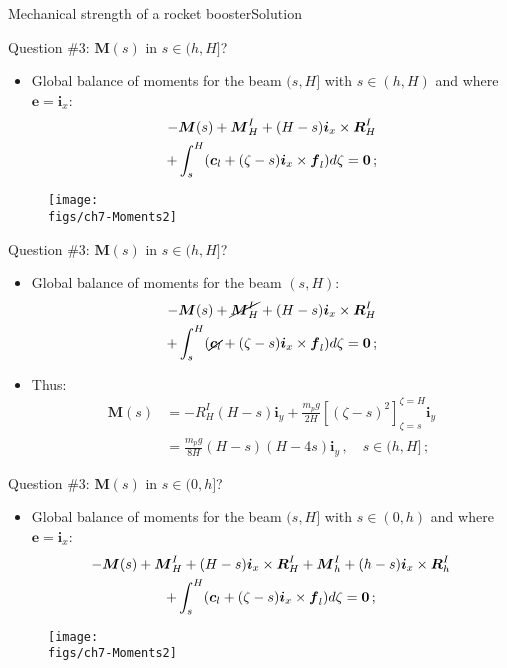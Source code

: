 \documentclass{beamer}
\newcommand{\id}{d}
\newcommand{\cj}{c}
\newcommand{\cv}{{\boldsymbol\cj}}
\newcommand{\xj}{x}
\newcommand{\yj}{y}
\newcommand{\ej}{e}
\renewcommand{\ij}{i}
\newcommand{\ev}{{\boldsymbol\ej}}
\newcommand{\iv}{{\boldsymbol\ij}}
\newcommand{\fj}{f}
\newcommand{\Rj}{R}
\newcommand{\fv}{{\boldsymbol\fj}}
\newcommand{\Rv}{{\boldsymbol\Rj}}
\newcommand{\Mresj}{M}
\newcommand{\Mres}{{\boldsymbol\Mresj}}
\newcommand{\bzero}{{\bf 0}}
\begin{document}
\begin{frame}{Mechanical strength of a rocket booster}{Solution}

\begin{overprint}

\vskip-20pt
\begin{exampleblock}{Question \#3: $\Mres(s)$ in $s\in(h,H]$?}
\begin{itemize}
\item Global balance of moments for the beam $(s,H]$ with $s\in(h,H)$ and where $\ev=\iv_\xj$:
\begin{multline*}
-\Mres(s)+\Mres_H^I+(H-s)\iv_\xj\times\Rv_H^I \\
+\int_s^H(\cv_l+(\zeta-s)\iv_\xj\times\fv_l) \id\zeta=\bzero\,;
\end{multline*}
\end{itemize}
\end{exampleblock}
\vskip-15pt
\begin{figure}
\centering\texttt{[image: \\figs/ch7-Moments2]}
\end{figure}

\vskip-20pt
\begin{exampleblock}{Question \#3: $\Mres(s)$ in $s\in(h,H]$?}
\begin{itemize}
\item Global balance of moments for the beam $(s,H)$:
\begin{multline*}
-\Mres(s)+\cancel{\Mres_H^I}+(H-s)\iv_\xj\times\Rv_H^I \\
+\int_s^H(\cancel{\cv_l}+(\zeta-s)\iv_\xj\times\fv_l) \id\zeta=\bzero\,;
\end{multline*}
\item Thus:
\begin{displaymath}
\begin{split}
\Mres(s) &= -\Rj_H^I(H-s)\iv_\yj+\frac{m_p g}{2H}\left[(\zeta-s)^2\right]_{\zeta=s}^{\zeta=H}\iv_\yj \\
&=\frac{m_pg}{8H}(H-s)(H-4s)\iv_\yj\,,\quad s\in(h,H]\,;
\end{split}
\end{displaymath}
\end{itemize}
\end{exampleblock}

\vskip-20pt
\begin{exampleblock}{Question \#3: $\Mres(s)$ in $s\in(0,h]$?}
\begin{itemize}
\item Global balance of moments for the beam $(s,H]$ with $s\in(0,h)$ and where $\ev=\iv_\xj$:
\begin{multline*}
-\Mres(s)+\Mres_H^I+(H-s)\iv_\xj\times\Rv_H^I +\Mres_h^I+(h-s)\iv_\xj\times\Rv_h^I \\
+\int_s^H(\cv_l+(\zeta-s)\iv_\xj\times\fv_l) \id\zeta=\bzero\,;
\end{multline*}
\end{itemize}
\end{exampleblock}
\vskip-15pt
\begin{figure}
\centering\texttt{[image: \\figs/ch7-Moments2]}
\end{figure}


\end{overprint}
\end{frame}
\end{document}
